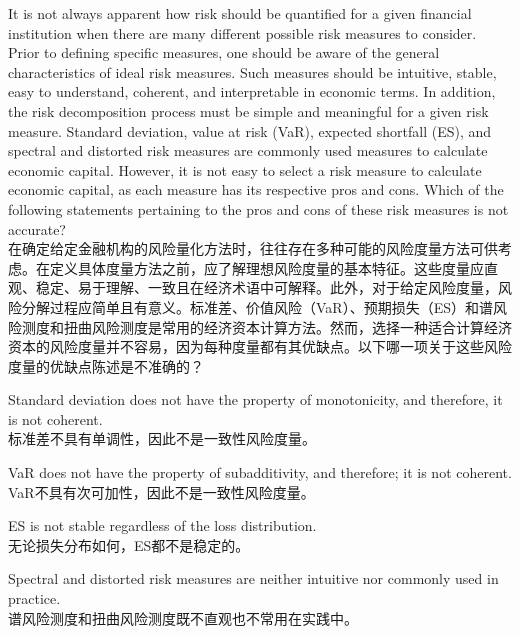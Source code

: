 \documentclass{article}
\newcounter{question} %
\begin{document}
\begin{question}
    It is not always apparent how risk should be quantified for a given financial institution when there are many
    different possible risk measures to consider. Prior to defining specific measures, one should
    be aware of the general characteristics of ideal risk measures. Such measures should be
    intuitive, stable, easy to understand, coherent, and interpretable in economic terms. In
    addition, the risk decomposition process must be simple and meaningful for a given risk
    measure. Standard deviation, value at risk (VaR), expected shortfall (ES), and spectral and
    distorted risk measures are commonly used measures to calculate economic capital. However, it
    is not easy to select a risk measure to calculate economic capital, as each measure has its
    respective pros and cons. Which of the following statements pertaining to the pros and cons of
    these risk measures is not accurate?
    \\在确定给定金融机构的风险量化方法时，往往存在多种可能的风险度量方法可供考虑。在定义具体度量方法之前，应了解理想风险度量的基本特征。这些度量应直观、稳定、易于理解、一致且在经济术语中可解释。此外，对于给定风险度量，风险分解过程应简单且有意义。标准差、价值风险（VaR）、预期损失（ES）和谱风险测度和扭曲风险测度是常用的经济资本计算方法。然而，选择一种适合计算经济资本的风险度量并不容易，因为每种度量都有其优缺点。以下哪一项关于这些风险度量的优缺点陈述是不准确的？
\end{question}

\begin{choices}
    \item Standard deviation does not have the property of monotonicity, and therefore, it is not
    coherent.\\
    标准差不具有单调性，因此不是一致性风险度量。
    \item VaR does not have the property of subadditivity, and therefore; it is not coherent.\\
    VaR不具有次可加性，因此不是一致性风险度量。
    \item ES is not stable regardless of the loss distribution.\\
    无论损失分布如何，ES都不是稳定的。
    \item Spectral and distorted risk measures are neither intuitive nor commonly used in practice.\\
    谱风险测度和扭曲风险测度既不直观也不常用在实践中。
\end{choices}
\end{document}
